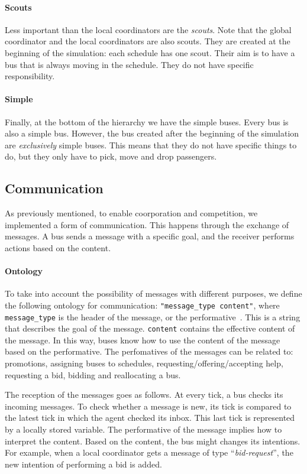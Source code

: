\paragraph{Scouts}

Less important than the local coordinators are the \textit{scouts}. Note that the global coordinator and the local coordinators are also scouts. They are created at the beginning of the simulation: each schedule has one scout. Their aim is to have a bus that is always moving in the schedule. They do not have specific responsibility.

\paragraph{Simple}

Finally, at the bottom of the hierarchy we have the simple buses. Every bus is also a simple bus. However, the bus created after the beginning of the simulation are \textit{exclusively} simple buses. This means that they do not have specific things to do, but they only have to pick, move and drop passengers.

\subsection{Communication}

As previously mentioned, to enable coorporation and competition, we implemented a form of communication. This happens through the exchange of messages. A bus sends a message with a specific goal, and the receiver performs actions based on the content.

\paragraph{Ontology}

To take into account the possibility of messages with different purposes, we define the following ontology for communication: \texttt{"message\_type content"}, where  \texttt{message\_type} is the header of the message, or the performative~\cite{fipa}. This is a string that describes the goal of the message. \texttt{content} contains the effective content of the message. In this way, buses know how to use the content of the message based on the performative. The perfomatives of the messages can be related to: promotions, assigning buses to schedules, requesting/offering/accepting help, requesting a bid, bidding and reallocating a bus. 

The reception of the messages goes as follows. At every tick, a bus checks its incoming messages. To check whether a message is new, its tick is compared to the latest tick in which the agent checked its inbox. This last tick is represented by a locally stored variable. The performative of the message implies how to interpret the content. Based on the content, the bus might changes its intentions. For example, when a local coordinator gets a message of type ``\textit{bid-request}'', the new intention of performing a bid is added.

